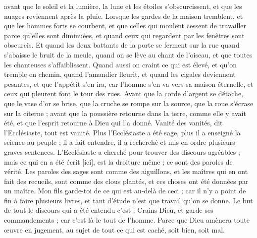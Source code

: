 \begin{multicols}{2}
avant que le soleil et la lumière, la lune et les étoiles s'obscurcissent, et que les nuages reviennent après la pluie.
Lorsque les gardes de la maison tremblent, et que les hommes forts se courbent, et que celles qui moulent cessent de travailler parce qu'elles sont diminuées, et quand ceux qui regardent par les fenêtres sont obscurcis.
Et quand les deux battants de la porte se ferment sur la rue quand s'abaisse le bruit de la meule, quand on se lève au chant de l'oiseau, et que toutes les chanteuses s'affaiblissent.
Quand aussi on craint ce qui est élevé, et qu'on tremble en chemin, quand l'amandier fleurit, et quand les cigales deviennent pesantes, et que l'appétit s'en ira, car l'homme s'en va vers sa maison éternelle, et ceux qui pleurent font le tour des rues.
Avant que la corde d'argent se détache, que le vase d'or se brise, que la cruche se rompe sur la source, que la roue s'écrase sur la citerne ;
avant que la poussière retourne dans la terre, comme elle y avait été, et que l'esprit retourne à Dieu qui l'a donné.
Vanité des vanités, dit l'Ecclésiaste, tout est vanité.
Plus l'Ecclésiaste a été sage, plus il a enseigné la science au peuple ; il a fait entendre, il a recherché et mis en ordre plusieurs graves sentences. 
L'Ecclésiaste a cherché pour trouver des discours agréables ; mais ce qui en a été écrit [ici], est la droiture même ; ce sont des paroles de vérité. 
Les paroles des sages sont comme des aiguillons, et les maîtres qui en ont fait des recueils, sont comme des clous plantés, et ces choses ont été données par un maître.
Mon fils garde-toi de ce qui est au-delà de ceci ; car il n'y a point de fin à faire plusieurs livres, et tant d'étude n'est que travail qu'on se donne.  
Le but de tout le discours qui a été entendu c'est : Crains Dieu, et garde ses commandements ; car c'est là le tout de l'homme.
Parce que Dieu amènera toute œuvre en jugement, au sujet de tout ce qui est caché, soit bien, soit mal.
\PPE{}
\end{multicols}
